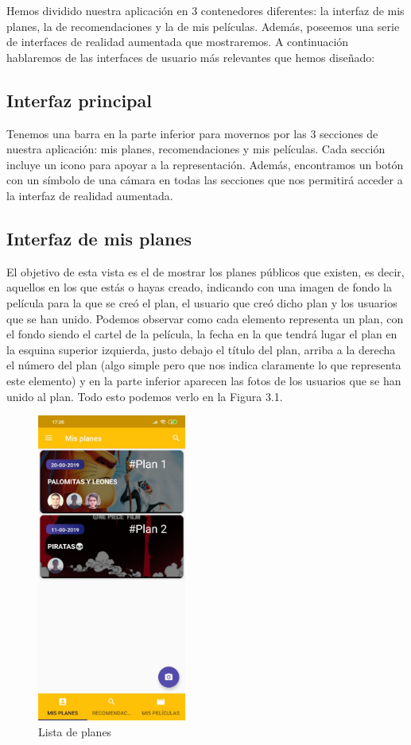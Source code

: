 Hemos dividido nuestra aplicación en 3 contenedores diferentes: la interfaz de mis planes, la de recomendaciones y la de mis películas. Además, poseemos una serie de interfaces de realidad aumentada que mostraremos. A continuación hablaremos
de las interfaces de usuario más relevantes que hemos diseñado:
\subsection{Interfaz principal}
\label{makereference3.4.1}
Tenemos una barra en la parte inferior para movernos por las 3 secciones de nuestra aplicación: mis planes, recomendaciones y mis películas.
Cada sección incluye un icono para apoyar a la representación.
Además, encontramos un botón con un símbolo de una cámara en todas las secciones que nos permitirá acceder a la interfaz de realidad aumentada.
\subsection{Interfaz de mis planes}
\label{makereference3.4.2}
El objetivo de esta vista es el de mostrar los planes públicos que existen, es decir, aquellos en los que estás o hayas creado, indicando con una imagen de fondo la película para la que se creó el plan, el usuario
que creó dicho plan y los usuarios que se han unido. 
Podemos observar como cada elemento representa un plan, con el fondo siendo el cartel de la película, la fecha en la que tendrá lugar el plan en la esquina superior izquierda,
justo debajo el título del plan, arriba a la derecha el número del plan (algo simple pero que nos indica
claramente lo que representa este elemento) y en la parte inferior aparecen las fotos de los usuarios que se han unido al plan.
Todo esto podemos verlo en la Figura 3.1.
\begin{figure}[H]
    \centering
    \includegraphics[height=4in]{figures/plansList.jpg}
    \caption{Lista de planes}
    \label{fig:birds}
\end{figure}


